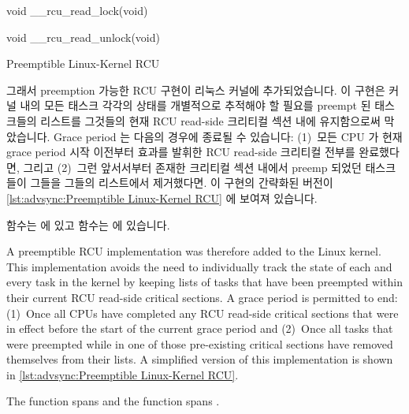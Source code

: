 \begin{listing}[tb]
\begin{fcvlabel}
\begin{VerbatimL}[commandchars=\\\[\]]
void __rcu_read_lock(void)									\lnlbl[lock:e]

void __rcu_read_unlock(void)		        						\lnlbl[unl:e]
\end{VerbatimL}
\end{fcvlabel}
\caption{Preemptible Linux-Kernel RCU}
\label{lst:advsync:Preemptible Linux-Kernel RCU}
\end{listing}

그래서 preemption 가능한 RCU 구현이 리눅스 커널에 추가되었습니다.
이 구현은 커널 내의 모든 태스크 각각의 상태를 개별적으로 추적해야 할 필요를
preempt 된 태스크들의 리스트를 그것들의 현재 RCU read-side 크리티컬 섹션 내에
유지함으로써 막았습니다.
Grace period 는 다음의 경우에 종료될 수 있습니다: (1)~모든 CPU 가 현재 grace
period 시작 이전부터 효과를 발휘한 RCU read-side 크리티컬 전부를 완료했다면,
그리고
(2)~그런 앞서서부터 존재한 크리티컬 섹션 내에서 preemp 되었던 태스크들이 그들을
그들의 리스트에서 제거했다면.
이 구현의 간략화된 버전이
\cref{lst:advsync:Preemptible Linux-Kernel RCU} 에 보여져 있습니다.
\begin{fcvref}
 함수는  에 있고
 함수는  에 있습니다.
\end{fcvref}

\iffalse

A preemptible RCU implementation was therefore added to the Linux kernel.
This implementation avoids the need to individually track the state of
each and every task in the kernel by keeping lists of tasks that have
been preempted within their current RCU read-side critical sections.
A grace period is permitted to end: (1)~Once all CPUs have completed any
RCU read-side critical sections that were in effect before the start
of the current grace period and
(2)~Once all tasks that were preempted
while in one of those pre-existing critical sections have removed
themselves from their lists.
A simplified version of this implementation is shown in
\cref{lst:advsync:Preemptible Linux-Kernel RCU}.
\begin{fcvref}
The  function spans  and
the  function spans .
\end{fcvref}

